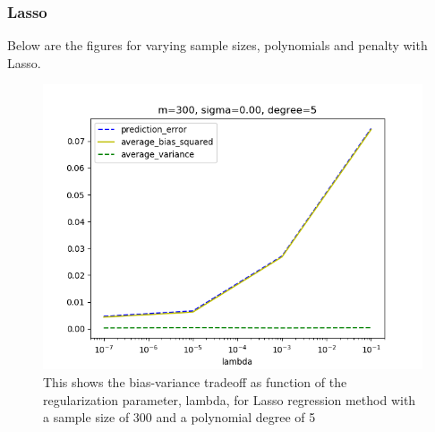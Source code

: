 \medskip



\subsubsection{Lasso}
Below are the figures for varying sample sizes, polynomials and penalty with Lasso.
\FloatBarrier
\begin{figure}[!ht]
	\centering
	\FloatBarrier
	\includegraphics[width=1\textwidth]{lasso_prediction_vs_lambda/lassoprediction_error_m300_d5_s0.png}
	
	\caption{This shows the bias-variance tradeoff as function of the regularization parameter, lambda, for Lasso regression method with a sample size of 300 and a polynomial degree of 5}
	\label{fig:3}
\end{figure}
\FloatBarrier

\medskip

